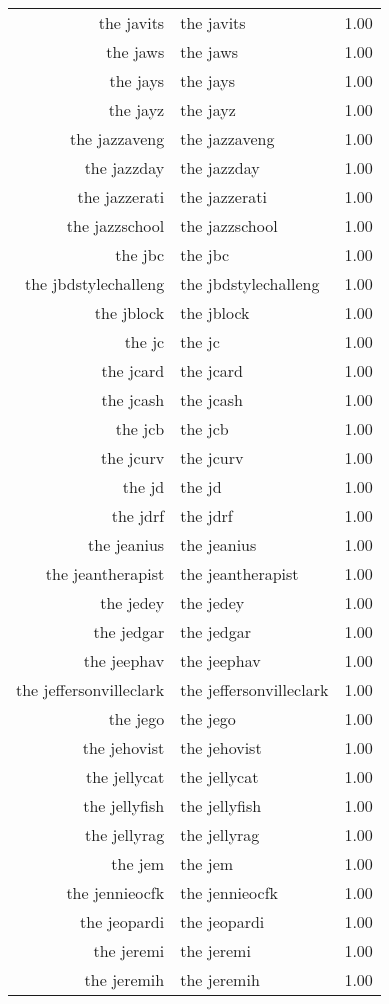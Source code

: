 \begin{table}[ht]
\begin{tabular}{rlr}
  the javits & the javits & 1.00 \\ 
  the jaws & the jaws & 1.00 \\ 
  the jays & the jays & 1.00 \\ 
  the jayz & the jayz & 1.00 \\ 
  the jazzaveng & the jazzaveng & 1.00 \\ 
  the jazzday & the jazzday & 1.00 \\ 
  the jazzerati & the jazzerati & 1.00 \\ 
  the jazzschool & the jazzschool & 1.00 \\ 
  the jbc & the jbc & 1.00 \\ 
  the jbdstylechalleng & the jbdstylechalleng & 1.00 \\ 
  the jblock & the jblock & 1.00 \\ 
  the jc & the jc & 1.00 \\ 
  the jcard & the jcard & 1.00 \\ 
  the jcash & the jcash & 1.00 \\ 
  the jcb & the jcb & 1.00 \\ 
  the jcurv & the jcurv & 1.00 \\ 
  the jd & the jd & 1.00 \\ 
  the jdrf & the jdrf & 1.00 \\ 
  the jeanius & the jeanius & 1.00 \\ 
  the jeantherapist & the jeantherapist & 1.00 \\ 
  the jedey & the jedey & 1.00 \\ 
  the jedgar & the jedgar & 1.00 \\ 
  the jeephav & the jeephav & 1.00 \\ 
  the jeffersonvilleclark & the jeffersonvilleclark & 1.00 \\ 
  the jego & the jego & 1.00 \\ 
  the jehovist & the jehovist & 1.00 \\ 
  the jellycat & the jellycat & 1.00 \\ 
  the jellyfish & the jellyfish & 1.00 \\ 
  the jellyrag & the jellyrag & 1.00 \\ 
  the jem & the jem & 1.00 \\ 
  the jennieocfk & the jennieocfk & 1.00 \\ 
  the jeopardi & the jeopardi & 1.00 \\ 
  the jeremi & the jeremi & 1.00 \\ 
  the jeremih & the jeremih & 1.00 \\ 

\end{tabular}
\end{table}
